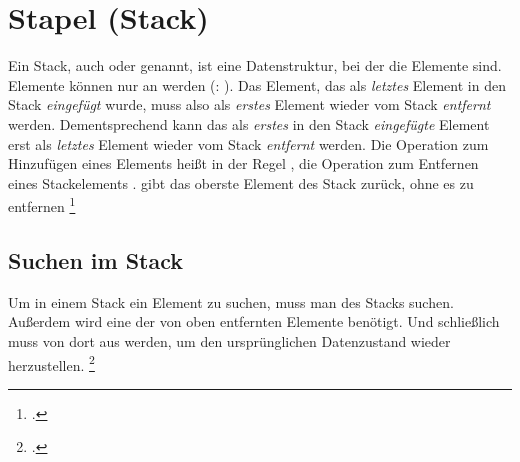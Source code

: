 \documentclass{bschlangaul-haupt}
\begin{document}

\chapter{Stapel (Stack)}

\begin{liQuellen}
\item \cite[Seite 275-281 (PDF 291-297)]{saake}
\item \cite{wiki:stapelspeicher}
\item \cite[Kapitel 6.2.1.4 Seite 182]{schneider}
\end{liQuellen}

Ein Stack, auch  oder  genannt, ist eine
Datenstruktur, bei der die Elemente 
sind. Elemente können nur an  werden (: ).
%
Das Element, das als \emph{letztes} Element in den Stack
\emph{eingefügt} wurde, muss also als \emph{erstes} Element wieder vom
Stack \emph{entfernt} werden.
%
Dementsprechend kann das als \emph{erstes} in den Stack
\emph{eingefügte} Element erst als \emph{letztes} Element wieder vom
Stack \emph{entfernt} werden.
%
Die Operation zum Hinzufügen eines Elements heißt in der Regel
, die Operation zum Entfernen eines Stackelements
.  gibt das oberste Element des Stack zurück,
ohne es zu entfernen
\footcite[Seite 19 (PDF 17)]{aud:fs:4}

%

\section{Suchen im Stack}

Um in einem Stack ein Element zu suchen, muss man  des Stacks suchen.
%
Außerdem wird eine  der
von oben entfernten Elemente benötigt.
%
Und schließlich muss von dort aus 
werden, um den ursprünglichen Datenzustand wieder herzustellen.
\footcite[Seite 20 (PDF 18)]{aud:fs:4}


\literatur
\end{document}
